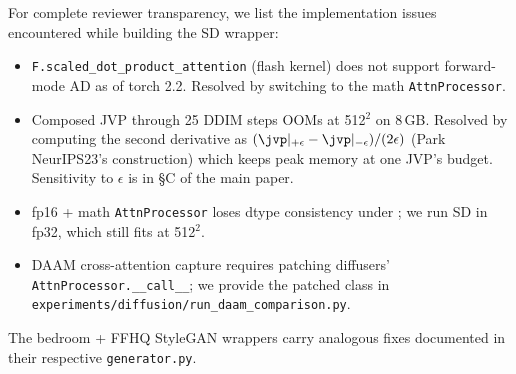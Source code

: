 For complete reviewer transparency, we list the implementation
issues encountered while building the SD wrapper:

\begin{itemize}
\item \texttt{F.scaled\_dot\_product\_attention} (flash kernel) does
  not support forward-mode AD as of torch 2.2. Resolved by switching
  to the math \texttt{AttnProcessor}.
\item Composed JVP through 25 DDIM steps OOMs at 512$^2$ on 8\,GB.
  Resolved by computing the second derivative as
  $(\jvp|_{+\epsilon} - \jvp|_{-\epsilon})/(2\epsilon)$ (Park
  NeurIPS23's construction) which keeps peak memory at one JVP's
  budget. Sensitivity to $\epsilon$ is in §C of the main paper.
\item fp16 + math \texttt{AttnProcessor} loses dtype consistency
  under \jvp; we run SD in fp32, which still fits at 512$^2$.
\item DAAM cross-attention capture requires patching diffusers'
  \texttt{AttnProcessor.\_\_call\_\_}; we provide the patched class
  in \texttt{experiments/diffusion/run\_daam\_comparison.py}.
\end{itemize}

The bedroom + FFHQ StyleGAN wrappers carry analogous fixes
documented in their respective \texttt{generator.py}.
